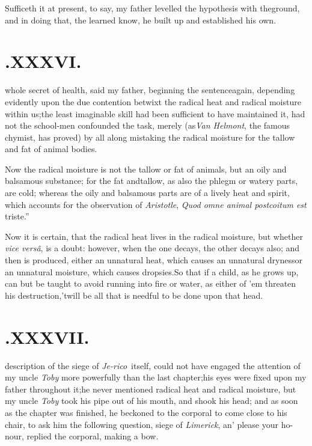 \documentclass{article}
\begin{document}
Sufficeth it at present, to say, my father levelled the
hypothesis with the\break ground, and in doing that, the learned know, he
built up and established his own.\tsh

\vfill
{}
\newpage
\null\smallskip
\section{.\enspace  XXXVI.}

 whole secret of health, said\break
my father, beginning the sentence\break again, depending evidently upon the
due contention betwixt the radical heat and radical moisture within
us;\tsk the least imaginable skill had been sufficient to have
maintained it, had not the school-men confounded the task, merely
(as\break \textit{Van Helmont}, the famous chymist, has proved) by all
along mistaking the radical moisture for the tallow and fat of
animal bodies.

Now the radical moisture is not the tallow or fat of animals,
but an oily and balsamous substance; for the fat and\break tallow, as
also the phlegm or watery parts, are cold; whereas the oily and
balsamous parts are of a lively heat and spirit, which accounts for
the observation of \textit{Aristotle}, \lqq\textit{Quod omne
animal post\break\lqq coitum est} triste.”

Now it is certain, that the radical heat lives in the radical moisture, but whether
\textit{vice versâ}, is a doubt: however, when the one decays, the other decays
also; and then is produced, either an unnatural heat, which causes an unnatural
dryness\tsh or an unnatural moisture, which causes dropsies.\tsh So that if a child,
as he grows up, can but be taught to avoid running into fire or water, as either of
’em threaten his destruction,\tsh ’twill\break
be all that is needful to be done upon\break
that head.\tsh

\vfill
{}
\newpage
\null\smallskip
\section{.\enspace  XXXVII.}

 description of the siege of
\textit{Je-\break rico}\sic\  itself, could not have engaged the attention of my
uncle \textit{Toby} more\break
powerfully than the last chapter;\tsk his
eyes were fixed upon my father throughout it;\tsk he never
mentioned radical heat and radical moisture, but my uncle
\textit{Toby}\break
took his pipe out of his mouth, and\break
shook his head; and as soon as the\break
chapter was finished, he beckoned to\break
the corporal to come close to his chair,\break
to ask him the following question,\break
{} 
\break
siege of \textit{Limerick}, an’ please your ho-\break
nour, replied the corporal, making a\break\etp
bow.
\end{document}
